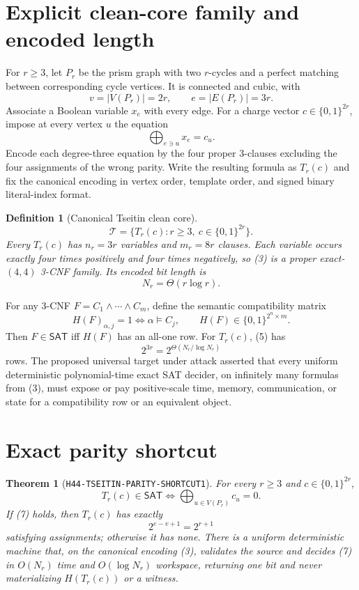 \documentclass[11pt]{article}
\newtheorem{definition}{Definition}
\newtheorem{theorem}{Theorem}
\newcommand{\SAT}{\mathsf{SAT}}
\begin{document}
\section{Explicit clean-core family and encoded length}

For $r\ge3$, let $P_r$ be the prism graph with two $r$-cycles and a perfect matching between corresponding cycle vertices.  It is connected and cubic, with
\[
 v=|V(P_r)|=2r,\qquad e=|E(P_r)|=3r.
 \tag{1}
\]
Associate a Boolean variable $x_e$ with every edge.  For a charge vector $c\in\{0,1\}^{2r}$, impose at every vertex $u$ the equation
\[
 \bigoplus_{e\ni u}x_e=c_u.
 \tag{2}
\]
Encode each degree-three equation by the four proper 3-clauses excluding the four assignments of the wrong parity.  Write the resulting formula as $T_r(c)$ and fix the canonical encoding in vertex order, template order, and signed binary literal-index format.

\begin{definition}[Canonical Tseitin clean core]
\[
 \mathcal T=\{T_r(c):r\ge3,\ c\in\{0,1\}^{2r}\}.
 \tag{3}
\]
Every $T_r(c)$ has $n_r=3r$ variables and $m_r=8r$ clauses.  Each variable occurs exactly four times positively and four times negatively, so (3) is a proper exact-$(4,4)$ 3-CNF family.  Its encoded bit length is
\[
 N_r=\Theta(r\log r).
 \tag{4}
\]
\end{definition}

For any 3-CNF $F=C_1\wedge\cdots\wedge C_m$, define the semantic compatibility matrix
\[
 H(F)_{\alpha,j}=1\Longleftrightarrow \alpha\models C_j,
 \qquad H(F)\in\{0,1\}^{2^n\times m}.
 \tag{5}
\]
Then $F\in\SAT$ iff $H(F)$ has an all-one row.  For $T_r(c)$, (5) has
\[
 2^{3r}=2^{\Theta(N_r/\log N_r)}
 \tag{6}
\]
rows.  The proposed universal target under attack asserted that every uniform deterministic polynomial-time exact SAT decider, on infinitely many formulas from (3), must expose or pay positive-scale time, memory, communication, or state for a compatibility row or an equivalent object.

\section{Exact parity shortcut}

\begin{theorem}[\texttt{H44-TSEITIN-PARITY-SHORTCUT1}]
For every $r\ge3$ and $c\in\{0,1\}^{2r}$,
\[
 T_r(c)\in\SAT
 \Longleftrightarrow
 \bigoplus_{u\in V(P_r)}c_u=0.
 \tag{7}
\]
If (7) holds, then $T_r(c)$ has exactly
\[
 2^{e-v+1}=2^{r+1}
 \tag{8}
\]
satisfying assignments; otherwise it has none.  There is a uniform deterministic machine that, on the canonical encoding (3), validates the source and decides (7) in $O(N_r)$ time and $O(\log N_r)$ workspace, returning one bit and never materializing $H(T_r(c))$ or a witness.
\end{theorem}
\end{document}
